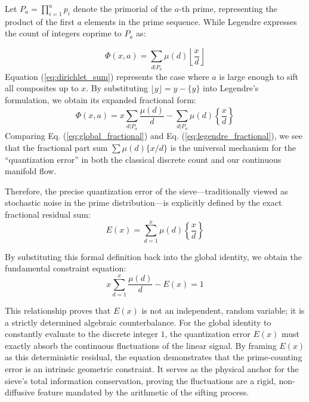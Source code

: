 \documentclass[sn-mathphys-num, pdflatex, referee]{sn-jnl}
\begin{document}
Let $P_a = \prod_{i=1}^a p_i$ denote the primorial of the $a$-th prime, representing the product of the first $a$ elements in the prime sequence. While Legendre expresses the count of integers coprime to $P_a$ as:

\begin{equation}
\Phi(x, a) = \sum_{d|P_a} \mu(d) \left\lfloor \frac{x}{d} \right\rfloor
\end{equation}
Equation (\ref{eq:dirichlet_sum}) represents the case where $a$ is large enough to sift all composites up to $x$. By substituting $\lfloor y \rfloor = y - \{y\}$ into Legendre's formulation, we obtain its expanded fractional form:
\begin{equation}
\Phi(x, a) = x \sum_{d|P_a} \frac{\mu(d)}{d} - \sum_{d|P_a} \mu(d) \left\{ \frac{x}{d} \right\}
\label{eq:legendre_fractional}
\end{equation}
Comparing Eq. (\ref{eq:global_fractional}) and Eq. (\ref{eq:legendre_fractional}), we see that the fractional part sum $\sum \mu(d) \{x/d\}$ is the universal mechanism for the ``quantization error'' in both the classical discrete count and our continuous manifold flow.

Therefore, the precise quantization error of the sieve---traditionally viewed as stochastic noise in the prime distribution---is explicitly defined by the exact fractional residual sum:
\begin{equation}
E(x) = \sum_{d=1}^{x} \mu(d) \left\{ \frac{x}{d} \right\}
\end{equation}

By substituting this formal definition back into the global identity, we obtain the fundamental constraint equation:
\begin{equation}
x \sum_{d=1}^{x} \frac{\mu(d)}{d} - E(x) = 1
\end{equation}

This relationship proves that $E(x)$ is not an independent, random variable; it is a strictly determined algebraic counterbalance. For the global identity to constantly evaluate to the discrete integer $1$, the quantization error $E(x)$ must exactly absorb the continuous fluctuations of the linear signal. By framing $E(x)$ as this deterministic residual, the equation demonstrates that the prime-counting error is an intrinsic geometric constraint. It serves as the physical anchor for the sieve's total information conservation, proving the fluctuations are a rigid, non-diffusive feature mandated by the arithmetic of the sifting process.
\end{document}

